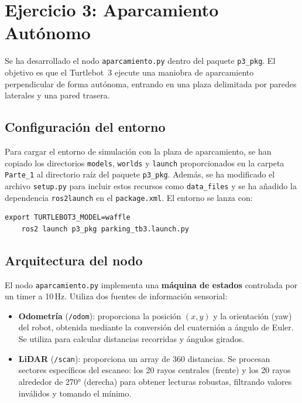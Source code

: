 \section{Ejercicio 3: Aparcamiento Autónomo}

Se ha desarrollado el nodo \texttt{aparcamiento.py} dentro del paquete \texttt{p3\_pkg}. El objetivo es que el Turtlebot~3 ejecute una maniobra de aparcamiento perpendicular de forma autónoma, entrando en una plaza delimitada por paredes laterales y una pared trasera.

\subsection*{Configuración del entorno}

Para cargar el entorno de simulación con la plaza de aparcamiento, se han copiado los directorios \texttt{models}, \texttt{worlds} y \texttt{launch} proporcionados en la carpeta \texttt{Parte\_1} al directorio raíz del paquete \texttt{p3\_pkg}. Además, se ha modificado el archivo \texttt{setup.py} para incluir estos recursos como \texttt{data\_files} y se ha añadido la dependencia \texttt{ros2launch} en el \texttt{package.xml}. El entorno se lanza con:

\begin{lstlisting}[style=bash]
	export TURTLEBOT3_MODEL=waffle
	ros2 launch p3_pkg parking_tb3.launch.py
\end{lstlisting}

\subsection*{Arquitectura del nodo}

El nodo \texttt{aparcamiento.py} implementa una \textbf{máquina de estados} controlada por un timer a 10\,Hz. Utiliza dos fuentes de información sensorial:

\begin{itemize}
	\item \textbf{Odometría} (\texttt{/odom}): proporciona la posición $(x, y)$ y la orientación (yaw) del robot, obtenida mediante la conversión del cuaternión a ángulo de Euler. Se utiliza para calcular distancias recorridas y ángulos girados.
	\item \textbf{LiDAR} (\texttt{/scan}): proporciona un array de 360 distancias. Se procesan sectores específicos del escaneo: los 20 rayos centrales (frente) y los 20 rayos alrededor de 270° (derecha) para obtener lecturas robustas, filtrando valores inválidos y tomando el mínimo.
\end{itemize}

